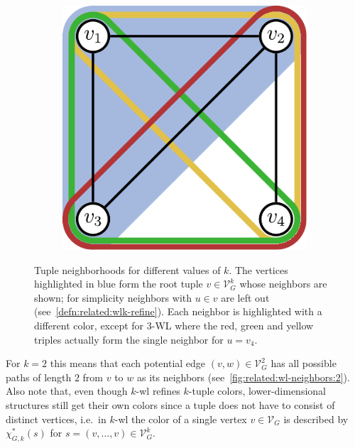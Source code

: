 \begin{figure}[ht]
	\begin{subfigure}{0.33\textwidth}
		\centering
		\includegraphics[width=0.8\linewidth]{gfx/related-work/wl3-neighbors.pdf}
		\label{fig:related:wl-neighbors:3}
	\end{subfigure}
	\caption[\ac{wl} neighborhoods for different values of $k$.]{
		Tuple neighborhoods for different values of $k$.
		The vertices highlighted in \textcolor{t_blue}{blue} form the root tuple $v \in \mathcal{V}_G^k$ whose neighbors are shown;
		for simplicity neighbors with $u \in v$ are left out (see~\cref{defn:related:wlk-refine}).
		Each neighbor is highlighted with a different color, except for 3-WL where the \textcolor{t_red}{red}, \textcolor{t_darkgreen}{green} and \textcolor{t_darkyellow}{yellow} triples actually form the single neighbor for $u = v_4$.
	}\label{fig:related:wl-neighbors}
\end{figure}
For $k = 2$ this means that each potential edge $(v, w) \in \mathcal{V}_G^2$ has all possible paths of length $2$ from $v$ to $w$ as its neighbors (see~\cref{fig:related:wl-neighbors:2}).
Also note that, even though $k$-\acs{wl} refines $k$-tuple colors, lower-dimensional structures still get their own colors since a tuple does not have to consist of distinct vertices, i.e.\ in $k$-\acs{wl} the color of a single vertex $v \in \mathcal{V}_G$ is described by $\chi^{*}_{G, k}(s)$ for $s = (v, \dots, v) \in \mathcal{V}_G^k$.

